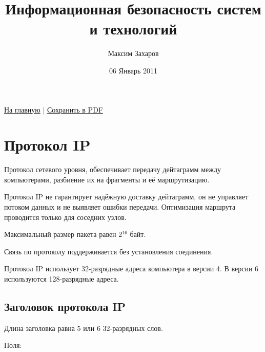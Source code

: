 \documentclass[12pt, russian, oneside, article]{ncc}
\begin{document}
\title{Информационная безопасность систем и технологий}
\author{Максим Захаров}
\date{06 Январь 2011}
\maketitle

\setcounter{tocdepth}{3}
\tableofcontents
\vspace*{1cm}


\href{file:///home/maxim/Documents/Git/lectures/index.org}{На главную} | \href{file:///home/maxim/Documents/Git/lectures/other/IBST_Lectures.pdf}{Сохранить в PDF}

\section{Протокол IP}
\label{sec-1}

Протокол сетевого уровня, обеспечивает передачу дейтаграмм между компьютерами, разбиение их на фрагменты и её маршрутизацию.

Протокол IP не гарантирует надёжную доставку дейтаграмм, он не управляет потоком данных и не выявляет ошибки передачи. Оптимизация маршрута проводится только для соседних узлов.

Максимальный размер пакета равен 2$^{\mathrm{16}}$ байт.

Связь по протоколу поддерживается без установления соединения.

Протокол IP использует 32-разрядные адреса компьютера в версии 4. В версии 6 используются 128-разрядные адреса.
\subsection{Заголовок протокола IP}
\label{sec-1_1}

Длина заголовка равна 5 или 6 32-разрядных слов.

Поля:
\end{document}
